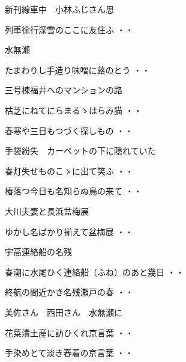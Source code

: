 新刊線車中　小林ふじさん思
\begin{shiika}列車徐行深雪のここに友住ふ
\hfill{・・}\end{shiika}
\vspace{ 0.4cm}
水無瀬
\begin{shiika}たまわりし手造り味噌に蕗のとう
\hfill{・・}\end{shiika}
\vspace{ 0.4cm}
三号棟福井へのマンションの路
\begin{shiika}枯芝にねてにらまるゝはらみ猫
\hfill{・・}\end{shiika}
\vspace{ 0.4cm}
\begin{shiika}春寒や三日もつづく探しもの
\hfill{・・}\end{shiika}
\vspace{ 0.4cm}
手袋紛失　カーペットの下に隠れていた
\begin{shiika}春灯失せものこゝに出て笑ふ
\hfill{・・}\end{shiika}
\vspace{ 0.4cm}
\begin{shiika}椿落つ今日も名知らぬ鳥の来て
\hfill{・・}\end{shiika}
\vspace{ 0.4cm}
大川夫妻と長浜盆梅展
\begin{shiika}ゆかし名ばかり揃えて盆梅展
\hfill{・・}\end{shiika}
\vspace{ 0.4cm}
宇高連絡船の名残
\begin{shiika}春潮に水尾ひく連絡船（ふね）のあと幾日
\hfill{・・}\end{shiika}
\begin{shiika}終航の間近かき名残瀬戸の春
\hfill{・・}\end{shiika}
\vspace{ 0.4cm}
美佐さん　西田さん　水無瀬に
\begin{shiika}花菜漬土産に訪ひくれ京言葉
\hfill{・・}\end{shiika}
\begin{shiika}手染めとて淡き春着の京言葉
\hfill{・・}\end{shiika}

